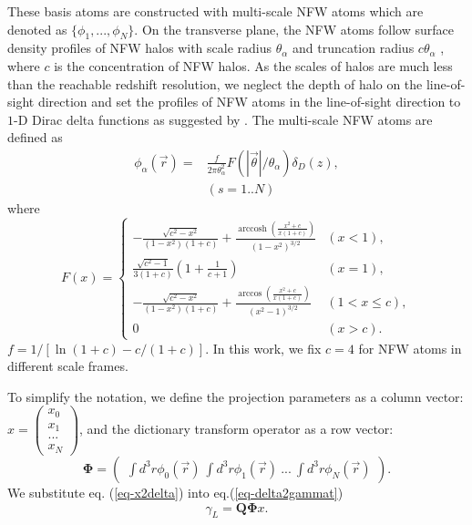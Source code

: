 \documentclass[twocolumn]{aastex62}
\DeclareMathOperator{\arccosh}{arccosh}
\begin{document}
These basis atoms are constructed with multi-scale NFW atoms which are denoted as $\{\phi_1,...,\phi_N\}$.
On the transverse plane, the NFW atoms follow surface density profiles of NFW halos
\citep{haloModel-TJ2003-3pt} with scale radius $\theta_\alpha$ and truncation radius $c \theta_\alpha$ ,
where $c$ is the concentration of NFW halos.
As the scales of halos are much less than the reachable redshift resolution, we neglect the depth of halo on the
line-of-sight direction and set the profiles of NFW atoms in the line-of-sight direction to $1$-D Dirac delta 
functions as suggested by \citep{LSS-massMap-Glimpse3D-Leonard2014}. 
The multi-scale NFW atoms are defined as
\begin{equation}
\begin{split}
\phi_\alpha(\vec{r}) =&\frac{f }{2 \pi \theta_\alpha^2 } F(|\vec{\theta}|/\theta_\alpha) \delta_D(z),\\
&  (s=1..N)
\end{split}
\end{equation}
where
\begin{equation}
F(x)=
\begin{cases}
-\frac{\sqrt{c^2-x^2}}{(1-x^2)(1+c)} + \frac{\arccosh \left(\frac{x^2+c}{x(1+c)}\right)}{(1-x^2)^{3/2}}  & (x<1),\\
\frac{\sqrt{c^2-1}}{3(1+c)} (1+\frac{1}{c+1}) & (x=1),\\
-\frac{\sqrt{c^2-x^2}}{(1-x^2)(1+c)} + \frac{\arccos\left(\frac{x^2+c}{x(1+c)}\right)}{(x^2-1)^{3/2}} & (1<x\leq c),\\
0& (x>c).
\end{cases}
\end{equation}
$f=1/[\ln (1+c)-c/(1+c)]$. In this work, we fix $c=4$ for NFW atoms in different scale frames.

To simplify the notation, we define the projection parameters as a column vector:
$x=\begin{pmatrix}
x_{0}\\
x_{1}\\
...\\
x_{N}
\end{pmatrix}$,
and the dictionary transform operator as a row vector:
\begin{equation}
\mathbf{\Phi}=\begin{pmatrix}
\int d^3r\phi_0(\vec{r}) ~\int d^3r \phi_1(\vec{r})~ ...~\int d^3r \phi_{N}(\vec{r})
\end{pmatrix}.
\end{equation}
We substitute eq. (\ref{eq-x2delta}) into eq.(\ref{eq-delta2gammat})
\begin{equation}\label{eq-x2gammat}
\gamma_L=\mathbf{Q}\mathbf{\Phi} x.
\end{equation}
\end{document}
